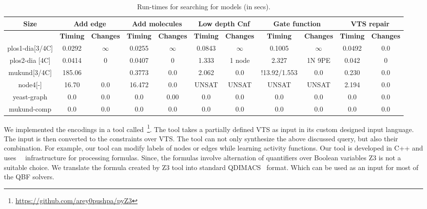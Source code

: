
\begin{table}[t]
  \centering
  \begin{tabular}[t]{|c|c|c|c|c|c|c|c|c|c|c}\hline
    {\multirow{2}{*} \textbf{Size}}  & \multicolumn{2}{c|}{\textbf{Add edge}} & \multicolumn{2}{c|}{\textbf{Add molecules}} & \multicolumn{2}{c|}{\textbf{Low depth Cnf}}  &  \multicolumn{2}{c|}{\textbf{Gate function}} &  \multicolumn{2}{c|}{\textbf{VTS repair}} \\\hline
   
   \cline{2-9}
    {} & {\textbf{Timing}} & {\textbf{Changes}} & {\textbf{Timing}} & {\textbf{Changes}} & {\textbf{Timing}} & {\textbf{Changes}} & {\textbf{Timing}} & {\textbf{Changes}} & {\textbf{Timing}} & {\textbf{Changes}} \\\hline
    
    plos1-dia[3/4C] & 0.0292 & $\infty$ & 0.0255 & $\infty$ & 0.0843 & $\infty$ & 0.1005 & $\infty$ & 0.0492 & 0.0\\\hline
    plos2-dia [4C] & 0.0414 & 0 & 0.0407 & 0 & 1.333 & 1 node & 2.327 & 1N 9PE & 0.042 & 0 \\\hline
    mukund[3/4C] & 185.06 &  & 0.3773 & 0.0 & 2.062 & 0.0 & !13.92/1.553 & 0.0 & 0.230 & 0.0 \\\hline
    node4[-] & 16.70 & 0.0 & 16.472 & 0.0 & UNSAT & UNSAT & UNSAT & UNSAT & 2.194 & 0.0\\\hline
    yeast-graph & 0.0 & 0.0 & 0.0 & 0.00 & 0.0 & 0.0 & 0.0  & 0.0 & 0.0 & 0.0 \\\hline
    mukund-comp & 0.0 & 0.0 & 0.0 & 0.0 & 0.0 & 0.0 & 0.0 & 0.0 & 0.0 & 0.0\\\hline
  \end{tabular}
  \caption{Run-times for searching for models (in secs).}
  \label{tab:qf-grabh}
\end{table}


We implemented the encodings in a tool called~\ourtool\footnote{{\url{https://github.com/arey0pushpa/pyZ3}}}.
%
The tool takes a partially defined VTS as input in its custom designed
input language. The input is then converted to the constraints over VTS. 
%
The tool can not only synthesize the above discussed query, but also their
combination.
%
For example, our tool can modify labels of nodes or edges while
learning activity functions.
%
Our tool is developed in C++ and uses~\zthree~\cite{z3} infrastructure for
processing formulas. 
%
Since, the formulas involve alternation of quantifiers over Boolean variables Z3 is not a suitable choice. We translate the formula created by Z3 tool into standard QDIMACS~\cite{qdimacs} format. Which can be used as an input for most of the QBF solvers. 

